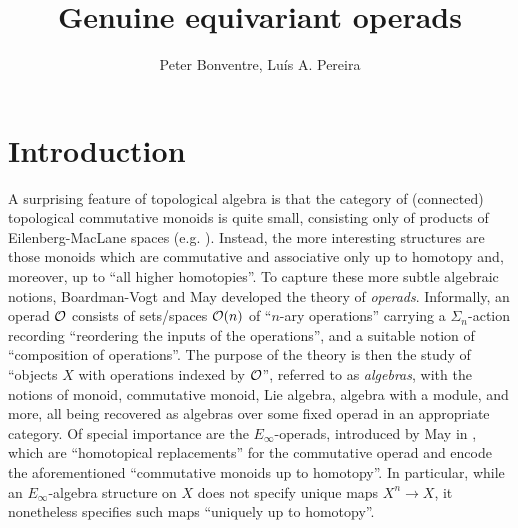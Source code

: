 \documentclass[a4paper,10pt]{article}%
\author{Peter Bonventre, Lu\'is A. Pereira}%
\title{Genuine equivariant operads}%
\begin{document}
	\maketitle%





\tableofcontents

\section{Introduction}


A surprising feature of topological algebra is that
the category of (connected) topological commutative monoids is quite small,
consisting only of products of Eilenberg-MacLane spaces (e.g. \cite[4K.6]{Hatcher}).
Instead, the more interesting structures are
those monoids which are commutative and associative only up to homotopy and, moreover, up to ``all higher homotopies''.
To capture these more subtle algebraic notions, Boardman-Vogt \cite{BV73} and May \cite{May72} developed
the theory of \textit{operads}.
Informally, an operad $\mathcal{O}$ consists of
sets/spaces $\mathcal{O}(n)$ of ``$n$-ary operations'' carrying a $\Sigma_n$-action recording
``reordering the inputs of the operations'',
and a suitable notion of ``composition of operations''.
The purpose of the theory is then the study of 
``objects $X$ with operations indexed by $\mathcal{O}$'',
referred to as \textit{algebras}, with the notions of monoid, commutative monoid, Lie algebra, algebra with a module, and more,
all being recovered as algebras over some fixed operad in an appropriate category.
Of special importance are the 
$E_\infty$-operads, introduced by 
May in \cite{May72}, which are 
``homotopical replacements'' for the commutative operad
 and encode the aforementioned
 ``commutative monoids up to homotopy''.
In particular, while an
 $E_\infty$-algebra structure on $X$ does not specify unique maps $X^n \to X$, 
 it nonetheless specifies such maps ``uniquely up to homotopy''.
\end{document}
